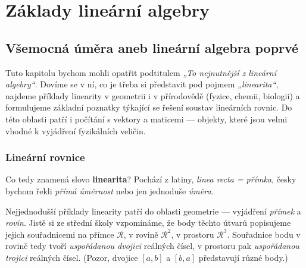 {
\chapter{Základy lineární algebry}\label{mai:IchapII}
\minitoc
  \section{Všemocná úměra aneb lineární algebra poprvé}
    Tuto kapitolu bychom mohli opatřit podtitulem \emph{„To nejnutnější z lineární algebry“}. 
    Dovíme se v ní, co je třeba si představit pod pojmem \emph{„linearita“}, najdeme příklady 
    linearity v geometrii i v přírodovědě (fyzice, chemii, biologii) a formulujeme základní 
    poznatky týkající se řešení soustav lineárních rovnic. Do této oblasti patří i počítání s 
    vektory a maticemi — objekty, které jsou velmi vhodné k vyjádření fyzikálních veličin.
    
    \subsection{Lineární rovnice}
      Co tedy znamená slovo \textbf{linearita}? Pochází z latiny, \emph{linea recta = přímka}, 
      česky bychom řekli \emph{přímá úměrnost} nebo jen jednoduše \emph{úměra}.
      
      Nejjednodušší příklady linearity patří do oblasti geometrie — vyjádření \emph{přímek} a 
      \emph{rovin}. Jistě si ze střední školy vzpomínáme, že body těchto útvarů popisujeme jejich 
      souřadnicemi na přímce \(\mathcal{R}\), v rovině \(\mathcal{R}^2\), v prostoru 
      \(\mathcal{R}^3\). Souřadnice bodu v rovině tedy tvoří \emph{uspořádanou dvojici} reálných
      čísel, v prostoru pak \emph{uspořádanou trojici} reálných čísel. (Pozor, dvojice \([a, b]\) a 
      \([b, a]\) představují různé body.)

}
